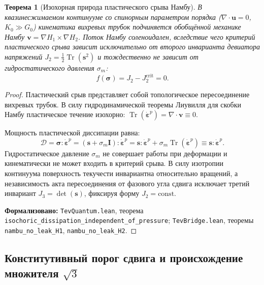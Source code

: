 \documentclass[11pt,a4paper]{article}
\newtheorem{theorem}{Теорема}
\theoremstyle{definition}
\theoremstyle{remark}
\begin{document}
\begin{theorem}[Изохорная природа пластического срыва Намбу]
\label{thm:isochoric_mises_form}
В квазинесжимаемом континууме со спинорным параметром порядка ($\nabla \cdot \mathbf{u} = 0$, $K_0 \gg G_0$) кинематика вихревых трубок подчиняется обобщённой механике Намбу $\mathbf{v} = \nabla H_1 \times \nabla H_2$. Поток Намбу соленоидален, вследствие чего критерий пластического срыва зависит исключительно от второго инварианта девиатора напряжений $J_2 = \frac{1}{2}\operatorname{Tr}(\mathbf{s}^2)$ и тождественно не зависит от гидростатического давления $\sigma_m$:
\begin{equation}
f(\boldsymbol{\sigma}) = J_2 - J_2^{\mathrm{crit}} = 0.
\label{eq:mises_isochoric_form}
\end{equation}
\end{theorem}
\begin{proof}
Пластический срыв представляет собой топологическое пересоединение вихревых трубок. В силу гидродинамической теоремы Лиувилля для скобки Намбу пластическое течение изохорно: $\operatorname{Tr}(\dot{\boldsymbol{\varepsilon}}^p) = \nabla \cdot \mathbf{v} \equiv 0$. 

Мощность пластической диссипации равна:
\begin{equation}
\mathcal{D} = \boldsymbol{\sigma} : \dot{\boldsymbol{\varepsilon}}^p = (\mathbf{s} + \sigma_m \mathbf{I}) : \dot{\boldsymbol{\varepsilon}}^p = \mathbf{s} : \dot{\boldsymbol{\varepsilon}}^p + \sigma_m \operatorname{Tr}(\dot{\boldsymbol{\varepsilon}}^p) \equiv \mathbf{s} : \dot{\boldsymbol{\varepsilon}}^p.
\end{equation}
Гидростатическое давление $\sigma_m$ не совершает работы при деформации и кинематически не может входить в критерий срыва. В силу изотропии континуума поверхность текучести инвариантна относительно вращений, а независимость акта пересоединения от фазового угла сдвига исключает третий инвариант $J_3 = \det(\mathbf{s})$, фиксируя форму $J_2 = \text{const}$.

\noindent\small\textbf{Формализовано:} \texttt{TevQuantum.lean}, теорема \texttt{isochoric_dissipation_independent_of_pressure}; \texttt{TevBridge.lean}, теоремы \texttt{nambu_no_leak_H1}, \texttt{nambu_no_leak_H2}.
\end{proof}

\subsection{Конститутивный порог сдвига и происхождение множителя $\sqrt{3}$}
\end{document}
